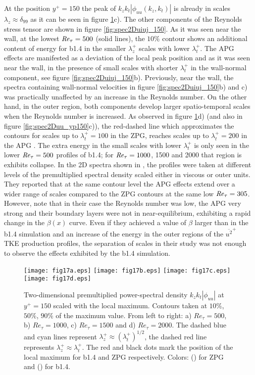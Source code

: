At the position $y^+=150$ the peak of $k_z k_t |\phi_{uu}(k_z,k_t)|$ is already in scales $\lambda_z \approx \delta_{99}$ as it can be seen in figure \ref{fig:spec2Duu_yp150_max}c).
The other components of the Reynolds stress tensor are shown in figure \ref{fig:spec2Duiuj_150}.
As it was seen near the wall, at the lowest $\mbox{\textit{Re}}_{\tau}=500$ (solid lines), the $10\%$ contour shows an additional content of energy for b1.4 in the smaller $\lambda_z^+$ scales with lower $\lambda_t^+$. 
The APG effects are manifested as a deviation of the local peak position and as it was seen near the wall, in the presence of small scales with shorter $\lambda_t^+$ in the wall-normal component, see figure \ref{fig:spec2Duiuj_150}b).
Previously, near the wall, the spectra containing wall-normal velocities in figure \ref{fig:spec2Duiuj_150}b) and c) was practically unaffected by an increase in the Reynolds number. On the other hand, in the outer region, both components develop larger spatio-temporal scales when the Reynolds number is increased. 
As observed in figure \ref{fig:spec2Duu_yp150_max}d) (and also in figure \ref{fig:spec2Duu_yp150}c)), the red-dashed line which approximates the contours for scales up to $\lambda_t^+ =100$ in the ZPG, reaches scales up to $\lambda_t^+ =200$ in the APG \citep{chandran_jfm_rapids_2017}.
The extra energy in the small scales with lower $\lambda_t^+$ is only seen in the lower $\mbox{\textit{Re}}_{\tau}=500$ profiles of b1.4; for $\mbox{\textit{Re}}_{\tau}=1000$, 1500 and 2000 that region is exhibits collapse.
In the 2D spectra shown in \cite{tanarro_2020}, the profiles were taken at different levels of the premultiplied spectral density scaled either in viscous or outer units. They reported that at the same contour level the APG effects extend over a wider range of scales compared to the ZPG contours at the same low $\mbox{\textit{Re}}_{\tau}=305$. However, note that in their case the Reynolds number was low, the APG very strong and their boundary layers were not in near-equilibrium, exhibiting a rapid change in the $\beta(x)$ curve. Even if they achieved a value of $\beta$ larger than in the b1.4 simulation and an increase of the energy in the outer regions of the $\overline{u^2}^+$ TKE production profiles, the separation of scales in their study was not enough to observe the effects exhibited by the b1.4 simulation.

\begin{figure}
\texttt{[image: fig17a.eps]}
\texttt{[image: fig17b.eps]}
\texttt{[image: fig17c.eps]}
\texttt{[image: fig17d.eps]}
  \caption{Two-dimensional premultiplied power-spectral density $k_z k_t |\phi_{uu}|$ at $y^+=150$ scaled with the local maximum. Contours taken at $10\%$, $50\%$, $90\%$ of the maximum value. From left to right: a) $Re_{\tau}=500$, b) $Re_{\tau}=1000$, c) $Re_{\tau}=1500$ and d) $Re_{\tau}=2000$. The dashed blue and cyan lines represent $\lambda_z^+ \approx (\lambda_t^+)^{1/2}$, the dashed red line represents $\lambda_z^+ \approx \lambda_t^+$. The red and black dots mark the position of the local maximum for b1.4 and ZPG respectively. Colors: (\protect\blackline) for ZPG and (\protect\orangeline) for b1.4.}
\label{fig:spec2Duu_yp150_max}
\end{figure}

